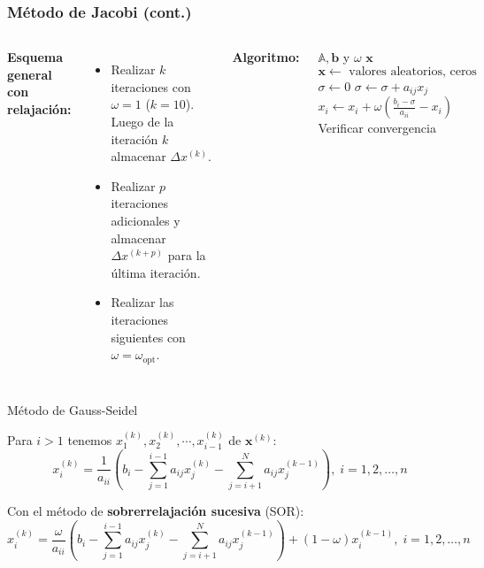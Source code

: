 \documentclass[9pt, aspectratio=169]{beamer}
\begin{document}
\begin{frame}
 \frametitle{Método de Jacobi (cont.)}
\begin{columns}[c]
\textbf{Esquema general con relajación:} 
\begin{itemize}
 \item Realizar $k$ iteraciones con $\omega = 1$ ($k = 10$). Luego de la iteración $k$ almacenar $\Delta x^{(k)}$.
 \item Realizar $p$ iteraciones adicionales y almacenar $\Delta x^{(k+p)}$ para la última iteración.
 \item Realizar las iteraciones siguientes con $\omega = \omega_{\text{opt}}$.
\end{itemize} \pause

  \textbf{Algoritmo:}
\begin{algorithmic}[1]
 \Require $\mathbb{A}, \mathbf{b}$ y $\omega$ 
 \Ensure $\mathbf{x}$ 
 \State $\mathbf{x} \gets \text{ valores aleatorios, ceros}$
\Repeat
    \State $\sigma \gets 0$
	\State $\sigma \gets \sigma + a_{ij} x_j$
       \EndIf
    \EndFor {}
    \State $x_i \gets x_i+\omega \left( \frac{b_i - \sigma}{a_{ii}} - x_i \right)$
  \EndFor {}
  \State Verificar convergencia
\end{algorithmic}
\end{columns}
\end{frame} 

\begin{frame}{Método de Gauss-Seidel}

Para $i > 1$ tenemos $x_1^{(k)}, x_2^{(k)}, \cdots,x_{i-1}^{(k)}$ de $\bm{x}^{(k)}$:
\begin{equation*}
    x_i^{(k)} = \dfrac{1}{a_{ii}} \left( b_i - \sum_{j=1}^{i-1} a_{ij}x_j^{(k)} - \sum_{j=i + 1}^N a_{ij}x_j^{(k-1)} \right), \;  i = 1, 2, \ldots, n
\end{equation*} \pause

Con el método de \textbf{sobrerrelajación sucesiva} (SOR):
\begin{equation*}
    x_i^{(k)} = \dfrac{\omega}{a_{ii}} \left( b_i - \sum_{j=1}^{i-1} a_{ij}x_j^{(k)} - \sum_{j=i + 1}^N a_{ij}x_j^{(k-1)} \right) + (1 - \omega) x_i^{(k - 1)}, \;  i = 1, 2, \ldots, n
\end{equation*} \pause

\end{frame}
\end{document}
